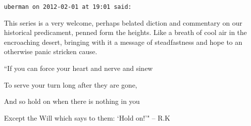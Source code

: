 \begin{footnotesize}
\begin{sffamily}
\hfill


\hfill

\texttt{uberman on 2012-02-01 at 19:01 said: }

This series is a very welcome, perhaps belated diction and commentary on our historical predicament, penned form the heights. Like a breath of cool air in the encroaching desert, bringing with it a message of steadfastness and hope to an otherwise panic stricken cause. 

``If you can force your heart and nerve and sinew

To serve your turn long after they are gone,

And so hold on when there is nothing in you

Except the Will which says to them: `Hold on!'" – R.K


\end{sffamily}\end{footnotesize}
